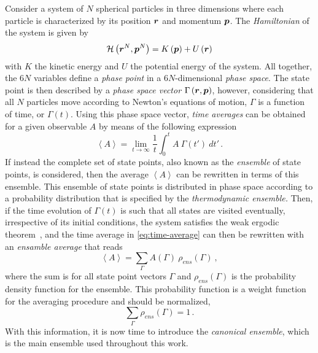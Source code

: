 Consider a system of $N$ spherical particles in three dimensions
where each particle is characterized by its position $\bm{r}$ and momentum $\bm{p}$.
The \emph{Hamiltonian} of the system is given by
\begin{equation}
    \mathcal{H} \left( \bm{r}^{N}, \bm{p}^{N} \right) = 
    K \left( \bm{p} \right) + U \left( \bm{r} \right)
    \label{eq:hamiltonian}
\end{equation}
with $K$ the kinetic energy and $U$ the potential energy of the system.
All together, the 6$N$ variables define a \emph{phase point} in a 6$N$-dimensional
\emph{phase space}. The state point is then described by a
\emph{phase space vector} $\Gamma \left( \bm{r}, \bm{p} \right)$, however, considering that all
$N$ particles move according to Newton's equations of motion, $\Gamma$ is
a function of time, or $\Gamma(t)$. Using this phase space vector, \emph{time averages}
can be obtained for a given observable $A$ by means of the following expression
\begin{equation}
    \left< A \right> = \lim_{t \to \infty} \frac{1}{t} 
    \int_{0}^{t} A \: \Gamma(t') \: dt' \, .
    \label{eq:time-average}
\end{equation}
If instead the complete set of state points, also known as the \emph{ensemble} of state
points, is considered, then the average $\left< A \right>$ can be rewritten in
terms of this ensemble.
This ensemble of state points is distributed in phase space according to a probability 
distribution that is specified by the \emph{thermodynamic ensemble.} Then, if the time 
evolution of $\Gamma(t)$ is such that all states are visited eventually, irrespective of 
its initial conditions, the system satisfies the weak ergodic
theorem~\cite{kittelElementaryStatisticalPhysics2004},
and the time average in \autoref{eq:time-average} can then be rewritten with an
\emph{ensamble average} that reads
\begin{equation}
    \left< A \right> = \sum_{\Gamma} A(\Gamma) \: \rho_{ens} (\Gamma)
    \: ,
    \label{eq:ensemble-average}
\end{equation}
where the sum is for all state point vectors $\Gamma$ and $\rho_{ens} (\Gamma)$
is the probability density function for the ensemble. This probability function is
a weight function for the averaging procedure and should be normalized,
\begin{equation}
    \sum_{\Gamma} \rho_{ens} (\Gamma) = 1 \, .
    \label{eq:normalized}
\end{equation}
With this information, it is now time to introduce the \emph{canonical ensemble}, which
is the main ensemble used throughout this work.

